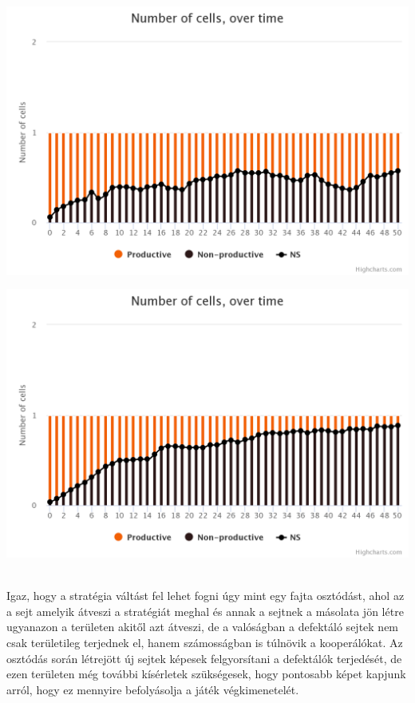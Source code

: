 \noindent
\begin{minipage}{\linewidth}
	\centering
	\begin{multicols}{2}
		\begin{Figure}
			\centering
			\includegraphics[width=\linewidth]{images/nemosztodik}
		\end{Figure}
		\begin{Figure}
			\centering
			\includegraphics[width=\linewidth]{images/osztodik}
		\end{Figure}
	\end{multicols}
\end{minipage}\\

Igaz, hogy a stratégia váltást fel lehet fogni úgy mint egy fajta osztódást, ahol az a sejt amelyik átveszi a stratégiát meghal és annak a sejtnek a másolata jön létre ugyanazon a területen akitől azt átveszi, de a valóságban a defektáló sejtek nem csak területileg terjednek el, hanem számosságban is túlnövik a kooperálókat.
Az osztódás során létrejött új sejtek képesek felgyorsítani a defektálók terjedését, de ezen területen még további kísérletek szükségesek, hogy pontosabb képet kapjunk arról, hogy ez mennyire befolyásolja a játék végkimenetelét.

